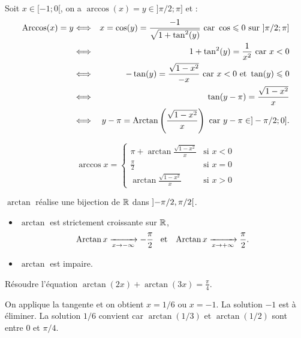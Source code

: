 \documentclass{magnoliaold}
\begin{document}
\begin{exos}
\begin{sol}
\begin{itemize}
  Soit $x\in [-1;0[$, on a $\arccos(x)=y \in ]\pi/2;\pi]$ et :
  \begin{eqnarray*}
  \operatorname{Arccos}(x)=y &\Longleftrightarrow & x=\cos(y)=\dfrac{-1}{\sqrt{1+\tan^2(y)}} \text{ car } \cos\leqslant 0 \text{ sur } ]\pi/2;\pi]\\
&\Longleftrightarrow & 1+\tan^2(y)=\dfrac{1}{x^2} \text{ car } x<0\\
&\Longleftrightarrow & -\tan(y)=\frac{\sqrt{1-x^2}}{-x} \text{ car } x<0 \text{ et } \tan(y)\leqslant 0\\
&\Longleftrightarrow & \tan(y-\pi)=\frac{\sqrt{1-x^2}}{x}\\
&\Longleftrightarrow & y-\pi=\operatorname{Arctan}\left(\frac{\sqrt{1-x^2}}{x}\right) \text{ car } y-\pi \in ]-\pi/2;0].
  \end{eqnarray*}
    
    \[\arccos x=
    \begin{cases}
    \pi+\arctan\frac{\sqrt{1-x^2}}{x} & \text{si $x<0$}\\
    \frac{\pi}{2} & \text{si $x=0$}\\
    \arctan\frac{\sqrt{1-x^2}}{x} & \text{si $x>0$}
    \end{cases}\]
    
   \end{itemize}
  \end{sol}
\end{exos}

\begin{proposition}[utile=-3]
$\arctan$ réalise une bijection de $\mathbb{R}$ dans $\left]-\pi/2,\pi/2\right[$.
\end{proposition}

\begin{proposition}[utile=-3]
\begin{itemize}
\item $\arctan$ est strictement croissante sur $\mathbb{R}$,
  \[\operatorname{Arctan} x\xrightarrow[x\rightarrow -\infty]{}-\frac{\pi}{2} \quad\!\text{et}\quad\!
    \operatorname{Arctan} x\xrightarrow[x\rightarrow +\infty]{} \frac{\pi}{2}.\]
\item $\arctan$ est impaire.
\end{itemize}
\end{proposition}

\begin{exoUnique}
\exemple Résoudre l'équation $\arctan(2x)+\arctan(3x)=\frac{\pi}{4}$.
  \begin{sol}
  On applique la tangente et on obtient $x=1/6$ ou $x=-1$. La solution $-1$
  est à éliminer. La solution $1/6$ convient car $\arctan(1/3)$ et
  $\arctan(1/2)$ sont entre 0 et $\pi/4$.
  \end{sol}  
\end{exoUnique}
\end{document}
